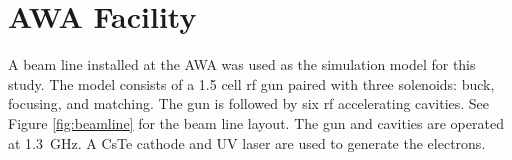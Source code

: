 \documentclass[letterpaper,  %
              ]{jacow}
\begin{document}
\section{AWA Facility }
A beam line installed at the AWA was used as the 
simulation model for this study. The model consists 
of a 1.5 cell rf gun paired with three solenoids: buck, 
focusing, and matching.  
The gun is followed by six rf accelerating cavities. 
See Figure \ref{fig:beamline} for the beam line layout. 
The gun and cavities are operated at \SI{1.3}{GHz}. 
A CsTe cathode and UV laser are used to generate 
the electrons.
\def \gunleft {-1.2}
\def \gunright {-0.3}
\end{document}
